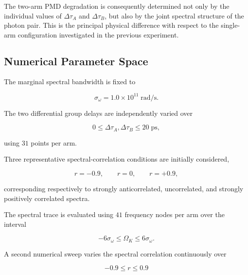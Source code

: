 The two-arm PMD degradation is consequently determined not only by the
individual values of \(\Delta\tau_A\) and \(\Delta\tau_B\), but also by the
joint spectral structure of the photon pair. This is the principal physical
difference with respect to the single-arm configuration investigated in the
previous experiment.



\subsection{Numerical Parameter Space}

The marginal spectral bandwidth is fixed to

\begin{equation}
\sigma_\omega
=
1.0\times10^{11}
\;\mathrm{rad/s}.
\label{eq:exp3_sigma_omega}
\end{equation}

The two differential group delays are independently varied over

\begin{equation}
0
\leq
\Delta\tau_A,\Delta\tau_B
\leq
20
\;\mathrm{ps},
\end{equation}

using \(31\) points per arm.

Three representative spectral-correlation conditions are initially considered,

\begin{equation}
r=-0.9,
\qquad
r=0,
\qquad
r=+0.9,
\label{eq:exp3_representative_correlations}
\end{equation}

corresponding respectively to strongly anticorrelated, uncorrelated, and
strongly positively correlated spectra.

The spectral trace is evaluated using \(41\) frequency nodes per arm over the
interval

\begin{equation}
-6\sigma_\omega
\leq
\Omega_K
\leq
6\sigma_\omega.
\end{equation}

A second numerical sweep varies the spectral correlation continuously over

\begin{equation}
-0.9
\leq
r
\leq
0.9
\end{equation}

